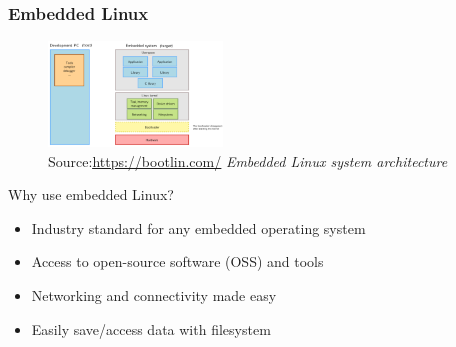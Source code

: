\documentclass[8pt,compress,aspectratio=169]{beamer}
\begin{document}
\begin{frame}
  \frametitle{Embedded Linux}
  \begin{figure}
    \includegraphics[width=175px]{assets/diagrams/embedded_linux.png}
    \centering
    \caption{\tiny Source:\underline{\href{https://bootlin.com/}{https://bootlin.com/}}\hspace{\textwidth}
    \textit{Embedded Linux system architecture}}
  \end{figure}
  \vspace{-16px}
  \begin{block}{Why use embedded Linux?}
    \small{
      \begin{itemize}
        \item Industry standard for any embedded operating system
        \item Access to open-source software (OSS) and tools
        \item Networking and connectivity made easy 
        \item Easily save/access data with filesystem
      \end{itemize}
    }
  \end{block}
\end{frame}
\end{document}
